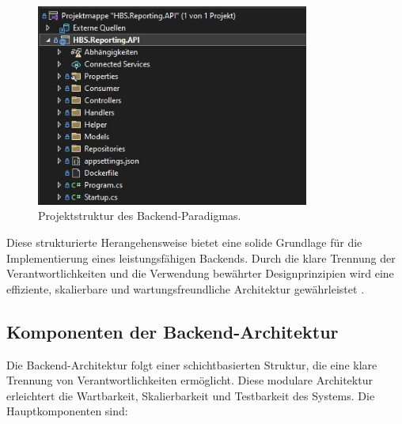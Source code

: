 \begin{figure}[H]
    \centering
    \includegraphics[width=0.8\textwidth, keepaspectratio]{images/backendparadigma.jpg}
    \caption{Projektstruktur des Backend-Paradigmas.}
    \label{fig:backend_code_paradigm}
\end{figure}

Diese strukturierte Herangehensweise bietet eine solide Grundlage für die Implementierung eines leistungsfähigen Backends. Durch die klare Trennung der Verantwortlichkeiten und die Verwendung bewährter Designprinzipien wird eine effiziente, skalierbare und wartungsfreundliche Architektur gewährleistet \cite{microsoftDotNetArchitecture}.




\subsection{Komponenten der Backend-Architektur}
Die Backend-Architektur folgt einer schichtbasierten Struktur, die eine klare Trennung von Verantwortlichkeiten ermöglicht. Diese modulare Architektur erleichtert die Wartbarkeit, Skalierbarkeit und Testbarkeit des Systems. Die Hauptkomponenten sind:

